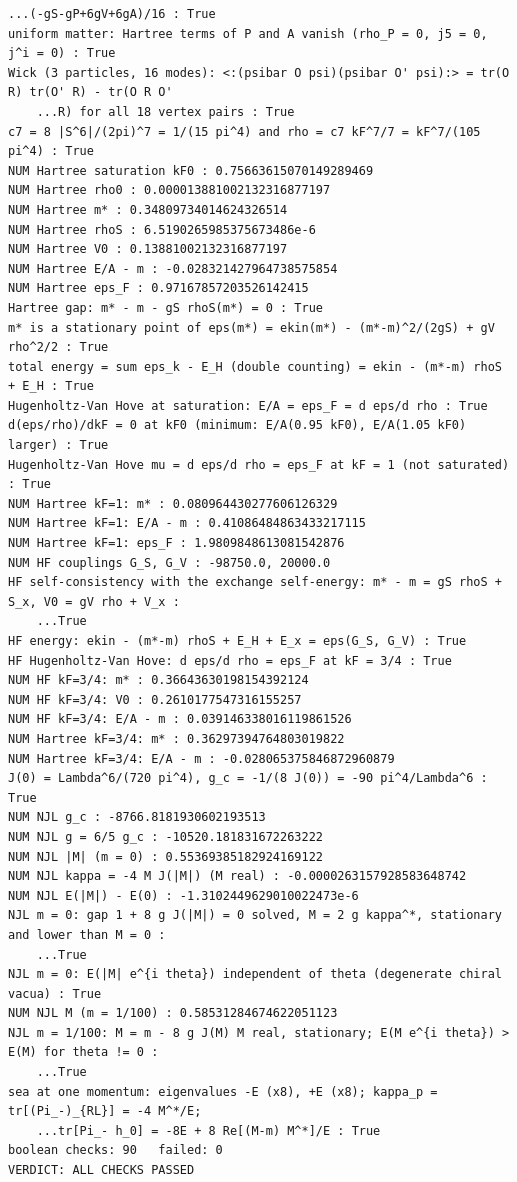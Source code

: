 \documentclass[10pt,a4paper]{article}
\begin{document}
\begin{Verbatim}[fontsize=\small,frame=single,framesep=2mm]
    ...(-gS-gP+6gV+6gA)/16 : True
uniform matter: Hartree terms of P and A vanish (rho_P = 0, j5 = 0, j^i = 0) : True
Wick (3 particles, 16 modes): <:(psibar O psi)(psibar O' psi):> = tr(O R) tr(O' R) - tr(O R O'
    ...R) for all 18 vertex pairs : True
c7 = 8 |S^6|/(2pi)^7 = 1/(15 pi^4) and rho = c7 kF^7/7 = kF^7/(105 pi^4) : True
NUM Hartree saturation kF0 : 0.75663615070149289469
NUM Hartree rho0 : 0.000013881002132316877197
NUM Hartree m* : 0.34809734014624326514
NUM Hartree rhoS : 6.5190265985375673486e-6
NUM Hartree V0 : 0.13881002132316877197
NUM Hartree E/A - m : -0.028321427964738575854
NUM Hartree eps_F : 0.97167857203526142415
Hartree gap: m* - m - gS rhoS(m*) = 0 : True
m* is a stationary point of eps(m*) = ekin(m*) - (m*-m)^2/(2gS) + gV rho^2/2 : True
total energy = sum eps_k - E_H (double counting) = ekin - (m*-m) rhoS + E_H : True
Hugenholtz-Van Hove at saturation: E/A = eps_F = d eps/d rho : True
d(eps/rho)/dkF = 0 at kF0 (minimum: E/A(0.95 kF0), E/A(1.05 kF0) larger) : True
Hugenholtz-Van Hove mu = d eps/d rho = eps_F at kF = 1 (not saturated) : True
NUM Hartree kF=1: m* : 0.080964430277606126329
NUM Hartree kF=1: E/A - m : 0.41086484863433217115
NUM Hartree kF=1: eps_F : 1.9809848613081542876
NUM HF couplings G_S, G_V : -98750.0, 20000.0
HF self-consistency with the exchange self-energy: m* - m = gS rhoS + S_x, V0 = gV rho + V_x :
    ...True
HF energy: ekin - (m*-m) rhoS + E_H + E_x = eps(G_S, G_V) : True
HF Hugenholtz-Van Hove: d eps/d rho = eps_F at kF = 3/4 : True
NUM HF kF=3/4: m* : 0.36643630198154392124
NUM HF kF=3/4: V0 : 0.2610177547316155257
NUM HF kF=3/4: E/A - m : 0.039146338016119861526
NUM Hartree kF=3/4: m* : 0.36297394764803019822
NUM Hartree kF=3/4: E/A - m : -0.028065375846872960879
J(0) = Lambda^6/(720 pi^4), g_c = -1/(8 J(0)) = -90 pi^4/Lambda^6 : True
NUM NJL g_c : -8766.8181930602193513
NUM NJL g = 6/5 g_c : -10520.181831672263222
NUM NJL |M| (m = 0) : 0.55369385182924169122
NUM NJL kappa = -4 M J(|M|) (M real) : -0.0000263157928583648742
NUM NJL E(|M|) - E(0) : -1.3102449629010022473e-6
NJL m = 0: gap 1 + 8 g J(|M|) = 0 solved, M = 2 g kappa^*, stationary and lower than M = 0 :
    ...True
NJL m = 0: E(|M| e^{i theta}) independent of theta (degenerate chiral vacua) : True
NUM NJL M (m = 1/100) : 0.58531284674622051123
NJL m = 1/100: M = m - 8 g J(M) M real, stationary; E(M e^{i theta}) > E(M) for theta != 0 :
    ...True
sea at one momentum: eigenvalues -E (x8), +E (x8); kappa_p = tr[(Pi_-)_{RL}] = -4 M^*/E;
    ...tr[Pi_- h_0] = -8E + 8 Re[(M-m) M^*]/E : True
boolean checks: 90   failed: 0
VERDICT: ALL CHECKS PASSED
\end{Verbatim}
\end{document}
